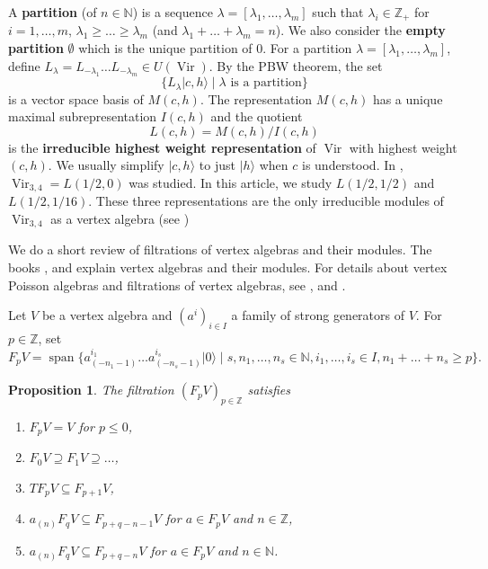 \documentclass[12pt, reqno]{amsart}
\newtheorem{proposition}[theorem]{Proposition}
\theoremstyle{remark}
\DeclareMathOperator{\Vir}{Vir}
\DeclareMathOperator{\vspan}{span}
\newcommand{\vac}{|0\rangle}
\begin{document}
A \textbf{partition} (of $n \in \mathbb{N}$) is a sequence $\lambda = [\lambda_1, \dots, \lambda_m]$ such that $\lambda_i \in \mathbb{Z}_+$ for $i = 1, \dots, m$, $\lambda_1 \ge \dots \ge \lambda_m$ (and $\lambda_1 + \dots + \lambda_m = n$).
We also consider the \textbf{empty partition} $\emptyset$ which is the unique partition of $0$.
For a partition $\lambda = [\lambda_1, \dots, \lambda_m]$, define $L_{\lambda} = L_{-\lambda_1}\dots L_{-\lambda_m} \in U(\Vir)$.
By the PBW theorem, the set
\begin{equation*}
  \{L_\lambda|c,h\rangle \mid \lambda\text{ is a partition}\}
\end{equation*}
is a vector space basis of $M(c, h)$.
The representation $M(c, h)$ has a unique maximal subrepresentation $I(c, h)$ and the quotient
\begin{equation*}
  L(c, h) = M(c, h)/I(c, h)
\end{equation*}
is the \textbf{irreducible highest weight representation} of $\Vir$ with highest weight $(c, h)$.
We usually simplify $|c, h\rangle$ to just $|h\rangle$ when $c$ is understood.
In \cite{andrews_singular_2022}, $\Vir_{3, 4} = L(1/2, 0)$ was studied.
In this article, we study $L(1/2, 1/2)$ and $L(1/2, 1/16)$.
These three representations are the only irreducible modules of $\Vir_{3, 4}$ as a vertex algebra (see \cite[Theorem 4.2]{wang_rationality_1993})

We do a short review of filtrations of vertex algebras and their modules.
The books \cite{kac_vertex_1998}, \cite{frenkel_vertex_2001} and \cite{lepowsky_introduction_2004} explain vertex algebras and their modules.
For details about vertex Poisson algebras and filtrations of vertex algebras, see \cite{li_vertex_2004}, \cite{li_abelianizing_2005} and \cite{arakawa_remark_2012}.

Let $V$ be a vertex algebra and $(a^i)_{i \in I}$ a family of strong generators of $V$.
For $p \in \mathbb{Z}$, set
\begin{equation*}
  F_pV = \vspan\{a^{i_1}_{(-n_1 - 1)}\dots a^{i_s}_{(-n_s - 1)}\vac \mid s, n_1, \dots, n_s \in \mathbb{N}, i_1, \dots, i_s \in I, n_1 + \dots + n_s \ge p\}.
\end{equation*}

\begin{proposition}
  \label{prp:1}
  The filtration $(F_pV)_{p\in \mathbb{Z}}$ satisfies
  \begin{enumerate}[label={(\alph*)}]
  \item $F_pV = V$ for $p \le 0$,
  \item $F_0V \supseteq F_1V \supseteq \dots$,
  \item $TF_pV \subseteq F_{p + 1}V$,
  \item $a_{(n)}F_qV \subseteq F_{p + q - n - 1}V$ for $a \in F_pV$ and $n \in \mathbb{Z}$,
  \item $a_{(n)}F_qV \subseteq F_{p + q - n}V$ for $a \in F_pV$ and $n \in \mathbb{N}$.
  \end{enumerate}
\end{proposition}
\end{document}
